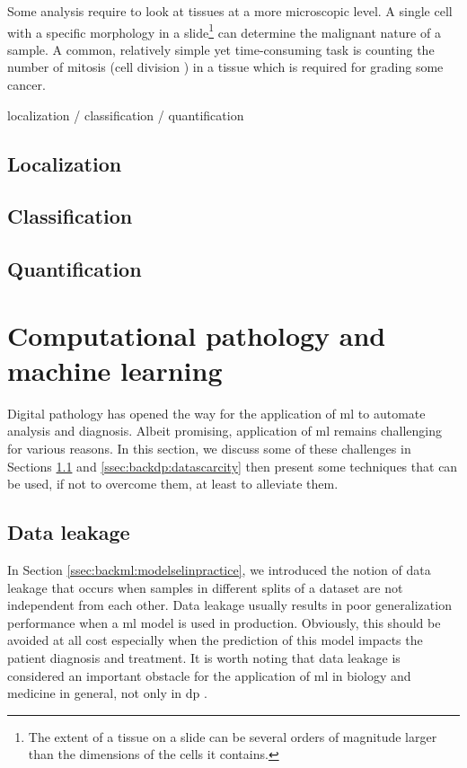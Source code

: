 Some analysis require to look at tissues at a more microscopic level. A single cell with a specific morphology in a slide\footnote{The extent of a tissue on a slide can be several orders of magnitude larger than the dimensions of the cells it contains.} can determine the malignant nature of a sample. A common, relatively simple yet time-consuming task is counting the number of mitosis (\ie cell division ) in a tissue which is required for grading some cancer.


localization / classification / quantification

\subsection{Localization}
\subsection{Classification}
\subsection{Quantification}



\section{Computational pathology and machine learning}
\label{sec:backdp:ml}

Digital pathology has opened the way for the application of \acrlong{ml} to automate analysis and diagnosis. Albeit promising, application of \acrlong{ml} remains challenging for various reasons. In this section, we discuss some of these challenges in Sections \ref{ssec:backdp:dataleakage} and \ref{ssec:backdp:datascarcity} then present some techniques that can be used, if not to overcome them, at least to alleviate them.

\subsection{Data leakage}
\label{ssec:backdp:dataleakage}

In Section \ref{ssec:backml:modelselinpractice}, we introduced the notion of data leakage that occurs when samples in different splits of a dataset are not independent from each other. Data leakage usually results in poor generalization performance when a \acrlong{ml} model is used in production. Obviously, this should be avoided at all cost especially when the prediction of this model impacts the patient diagnosis and treatment. It is worth noting that data leakage is considered an important obstacle for the application of \acrlong{ml} in biology and medicine in general, not only in \acrlong{dp} \parencite{ching2018opportunities}. 

